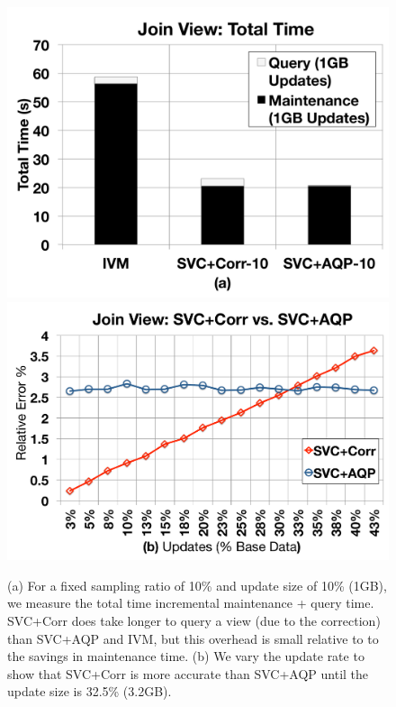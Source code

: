 \begin{figure}[t]
\centering
 \includegraphics[scale=0.13]{exp/msj_4.pdf}
 \includegraphics[scale=0.13]{exp/msj_6.pdf}\vspace{-.5em}
  \caption{(a) For a fixed sampling ratio of 10\% and update size of 10\% (1GB), we measure the total time incremental maintenance + query time. SVC+Corr does take longer to query a view (due to the correction) than SVC+AQP and IVM, but this overhead is small relative to to the savings in maintenance time. (b) We vary the update rate to show that SVC+Corr is more accurate than SVC+AQP until the update size is 32.5\% (3.2GB). \vspace{-1em} \label{exp-1-total}}
\end{figure}


